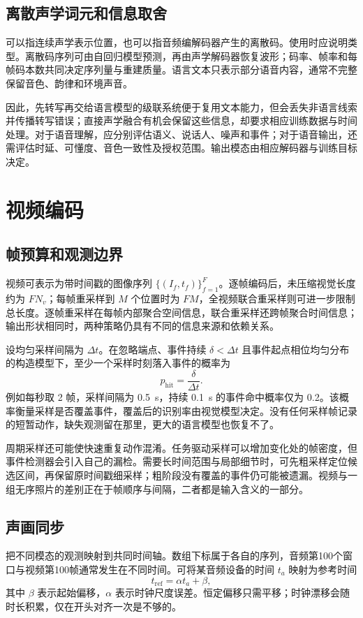 \documentclass[../textbook.tex]{subfiles}
\begin{document}
\subsection{离散声学词元和信息取舍}
可以指连续声学表示位置，也可以指音频编解码器产生的离散码。使用时应说明类型。离散码序列可由自回归模型预测，再由声学解码器恢复波形；码率、帧率和每帧码本数共同决定序列量与重建质量。语言文本只表示部分语音内容，通常不完整保留音色、韵律和环境声音。

因此，先转写再交给语言模型的级联系统便于复用文本能力，但会丢失非语言线索并传播转写错误；直接声学融合有机会保留这些信息，却要求相应训练数据与时间处理。对于语音理解，应分别评估语义、说话人、噪声和事件；对于语音输出，还需评估时延、可懂度、音色一致性及授权范围。输出模态由相应解码器与训练目标决定。

\section{视频编码}
\optional
\subsection{帧预算和观测边界}
视频可表示为带时间戳的图像序列 $\{(I_f,t_f)\}_{f=1}^F$。逐帧编码后，未压缩视觉长度约为 $FN_v$；每帧重采样到 $M$ 个位置时为 $FM$，全视频联合重采样则可进一步限制总长度。逐帧重采样在每帧内部聚合空间信息，联合重采样还跨帧聚合时间信息；输出形状相同时，两种策略仍具有不同的信息来源和依赖关系。

设均匀采样间隔为 $\Delta t$。在忽略端点、事件持续 $\delta<\Delta t$ 且事件起点相位均匀分布的构造模型下，至少一个采样时刻落入事件的概率为
\begin{equation}
 p_{\mathrm{hit}}=\frac{\delta}{\Delta t}.
\end{equation}
例如每秒取 2 帧，采样间隔为 \qty{0.5}{\second}，持续 \qty{0.1}{\second} 的事件命中概率仅为 0.2。该概率衡量采样是否覆盖事件，覆盖后的识别率由视觉模型决定。没有任何采样帧记录的短暂动作，缺失观测留在那里，更大的语言模型也恢复不了。

周期采样还可能使快速重复动作混淆。任务驱动采样可以增加变化处的帧密度，但事件检测器会引入自己的漏检。需要长时间范围与局部细节时，可先粗采样定位候选区间，再保留原时间戳细采样；粗阶段没有覆盖的事件仍可能被遗漏。视频与一组无序照片的差别正在于帧顺序与间隔，二者都是输入含义的一部分。

\subsection{声画同步}
把不同模态的观测映射到共同时间轴。数组下标属于各自的序列，音频第100个窗口与视频第100帧通常发生在不同时间。可将某音频设备的时间 $t_a$ 映射为参考时间
\begin{equation}
 t_{\mathrm{ref}}=\alpha t_a+\beta,
\end{equation}
其中 $\beta$ 表示起始偏移，$\alpha$ 表示时钟尺度误差。恒定偏移只需平移；时钟漂移会随时长积累，仅在开头对齐一次是不够的。
\end{document}
